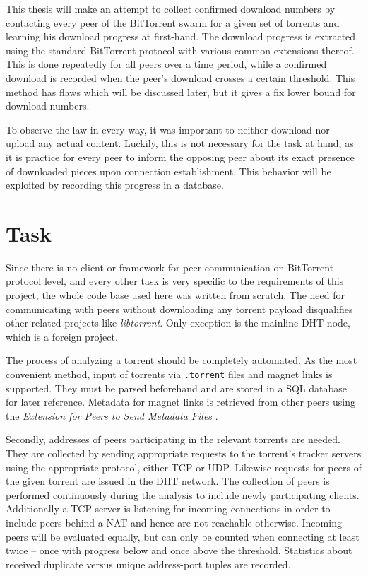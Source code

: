 \documentclass[10pt, a4paper, twoside, headsepline]{scrbook}
\renewcommand{\_}{\origunderscore\allowbreak}
\begin{document}
This thesis will make an attempt to collect confirmed download numbers by contacting every peer of the BitTorrent swarm for a given set of torrents and learning his download progress at first-hand. The download progress is extracted using the standard BitTorrent protocol with various common extensions thereof. This is done repeatedly for all peers over a time period, while a confirmed download is recorded when the peer's download crosses a certain threshold. This method has flaws which will be discussed later, but it gives a fix lower bound for download numbers.

To observe the law in every way, it was important to neither download nor upload any actual content. Luckily, this is not necessary for the task at hand, as it is practice for every peer to inform the opposing peer about its exact presence of downloaded pieces upon connection establishment. This behavior will be exploited by recording this progress in a database.

\section{Task}
Since there is no client or framework for peer communication on BitTorrent protocol level, and every other task is very specific to the requirements of this project, the whole code base used here was written from scratch. The need for communicating with peers without downloading any torrent payload disqualifies other related projects like \emph{libtorrent}. Only exception is the mainline DHT node, which is a foreign project.

The process of analyzing a torrent should be completely automated. As the most convenient method, input of torrents via \texttt{.torrent} files and magnet links is supported. They must be parsed beforehand and are stored in a SQL database for later reference. Metadata for magnet links is retrieved from other peers using the \emph{Extension for Peers to Send Metadata Files} \cite{bep9}.

Secondly, addresses of peers participating in the relevant torrents are needed. They are collected by sending appropriate requests to the torrent's tracker servers using the appropriate protocol, either TCP or UDP. Likewise requests for peers of the given torrent are issued in the DHT network. The collection of peers is performed continuously during the analysis to include newly participating clients. Additionally a TCP server is listening for incoming connections in order to include peers behind a NAT and hence are not reachable otherwise. Incoming peers will be evaluated equally, but can only be counted when connecting at least twice -- once with progress below and once above the threshold. Statistics about received duplicate versus unique address-port tuples are recorded.
\end{document}
